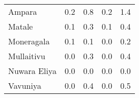 \begin{tabular}{lrrrr}
Ampara       &            0.2 &                 0.8 &            0.2 &                 1.4 \\
Matale       &            0.1 &                 0.3 &            0.1 &                 0.4 \\
Moneragala   &            0.1 &                 0.1 &            0.0 &                 0.2 \\
Mullaitivu   &            0.0 &                 0.3 &            0.0 &                 0.4 \\
Nuwara Eliya &            0.0 &                 0.0 &            0.0 &                 0.0 \\
Vavuniya     &            0.0 &                 0.4 &            0.0 &                 0.5 \\
\bottomrule
\end{tabular}
